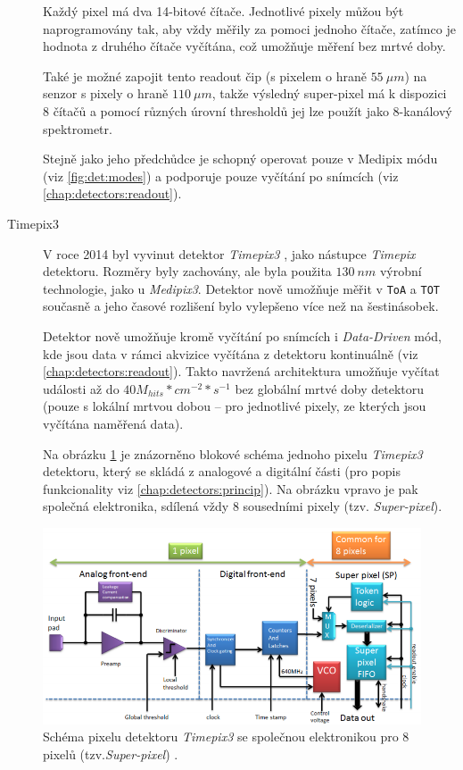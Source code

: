 \begin{description}
	Každý pixel má dva 14-bitové čítače. Jednotlivé pixely můžou být naprogramovány tak, aby vždy měřily za pomoci jednoho čítače, zatímco je hodnota z druhého čítače vyčítána, což umožňuje měření bez mrtvé doby.

	Také je možné zapojit tento readout čip (s pixelem o hraně $55~\mu m$) na senzor s pixely o hraně $110~\mu m$, takže výsledný super-pixel má k dispozici 8 čítačů a pomocí různých úrovní thresholdů jej lze použít jako 8-kanálový spektrometr.

	Stejně jako jeho předchůdce je schopný operovat pouze v Medipix módu (viz \ref{fig:det:modes}) a podporuje pouze vyčítání po snímcích (viz \ref{chap:detectors:readout}).

	\item[Timepix3]\label{chap:detectors:medipix_overview:timepix3} V roce 2014 byl vyvinut detektor \textit{Timepix3} \cite{timepix3}, jako nástupce \textit{Timepix} detektoru. Rozměry byly zachovány, ale byla použita $130~nm$ výrobní technologie, jako u \textit{Medipix3}. Detektor nově umožňuje měřit v \texttt{ToA} a \texttt{TOT} současně a jeho časové rozlišení bylo vylepšeno více než na šestinásobek.

	Detektor nově umožňuje kromě vyčítání po snímcích i \textit{Data-Driven} mód, kde jsou data v rámci akvizice vyčítána z detektoru kontinuálně (viz \ref{chap:detectors:readout}). Takto navržená architektura umožňuje vyčítat události až do $40M_{hits}*cm^{-2}*s^{-1}$ bez globální mrtvé doby detektoru (pouze s lokální mrtvou dobou -- pro jednotlivé pixely, ze kterých jsou vyčítána naměřená data).

	Na obrázku \ref{fig:det:medipix_overview:timepix3_schema} je znázorněno blokové schéma jednoho pixelu \textit{Timepix3} detektoru, který se skládá z analogové a digitální části (pro popis funkcionality viz \ref{chap:detectors:princip}). Na obrázku vpravo je pak společná elektronika, sdílená vždy 8 sousedními pixely (tzv. \textit{Super-pixel}).

\end{description}

\begin{figure}
	\begin{center}
		\includegraphics[width=15cm]{figures/det_timepix3_schema.png}
		\caption{Schéma pixelu detektoru \textit{Timepix3} se společnou elektronikou pro 8 pixelů (tzv.\textit{Super-pixel}) \cite{timepix3}.}
		\label{fig:det:medipix_overview:timepix3_schema}
	\end{center}
\end{figure}

